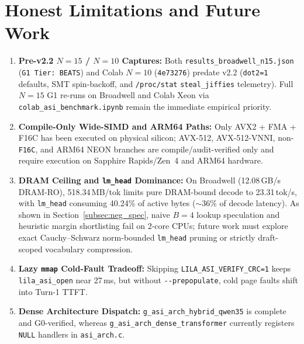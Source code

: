 \documentclass[11pt,a4paper]{article}
\begin{document}
\section{Honest Limitations and Future Work}

\begin{enumerate}
    \item \textbf{Pre-v2.2 $N=15$ / $N=10$ Captures:} Both \texttt{results\_broadwell\_n15.json} (\texttt{G1 Tier: BEATS}) and Colab $N=10$ (\texttt{4e73276}) predate v2.2 (\texttt{dot2=1} defaults, SMT spin-backoff, and \texttt{/proc/stat} \texttt{steal\_jiffies} telemetry). Full $N=15$ G1 re-runs on Broadwell and Colab Xeon via \texttt{colab\_asi\_benchmark.ipynb} remain the immediate empirical priority.
    \item \textbf{Compile-Only Wide-SIMD and ARM64 Paths:} Only AVX2 + FMA + F16C has been executed on physical silicon; AVX-512, AVX-512-VNNI, non-\texttt{F16C}, and ARM64 NEON branches are compile/audit-verified only and require execution on Sapphire Rapids/Zen~4 and ARM64 hardware.
    \item \textbf{DRAM Ceiling and \texttt{lm\_head} Dominance:} On Broadwell (12.08\,GB/s DRAM-RO), 518.34\,MB/tok limits pure DRAM-bound decode to 23.31\,tok/s, with \texttt{lm\_head} consuming 40.24\% of active bytes ($\sim$36\% of decode latency). As shown in Section~\ref{subsec:neg_spec}, naive $B=4$ lookup speculation and heuristic margin shortlisting fail on 2-core CPUs; future work must explore exact Cauchy--Schwarz norm-bounded \texttt{lm\_head} pruning or strictly draft-scoped vocabulary compression.
    \item \textbf{Lazy \texttt{mmap} Cold-Fault Tradeoff:} Skipping \texttt{LILA\_ASI\_VERIFY\_CRC=1} keeps \texttt{lila\_asi\_open} near 27\,ms, but without \texttt{-{}-prepopulate}, cold page faults shift into Turn-1 TTFT.
    \item \textbf{Dense Architecture Dispatch:} \texttt{g\_asi\_arch\_hybrid\_qwen35} is complete and G0-verified, whereas \texttt{g\_asi\_arch\_dense\_transformer} currently registers \texttt{NULL} handlers in \texttt{asi\_arch.c}.
\end{enumerate}
\end{document}
